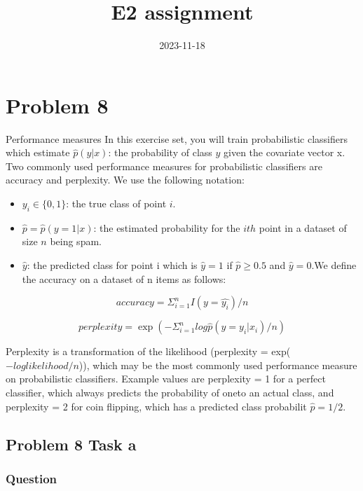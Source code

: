 \documentclass[
]{article}
\title{E2 assignment}
\author{}
\date{\vspace{-2.5em}2023-11-18}
\begin{document}
\maketitle

\hypertarget{problem-8}{%
\section{Problem 8}\label{problem-8}}

Performance measures In this exercise set, you will train probabilistic
classifiers which estimate \(\hat{p}(y | x)\): the probability of class
\(y\) given the covariate vector x. Two commonly used performance
measures for probabilistic classifiers are accuracy and perplexity. We
use the following notation:

\begin{itemize}
\item
  \(y_i \in \{0,1\}\): the true class of point \(i\).
\item
  \(\hat{p} = \hat{p}(y = 1 | x)\): the estimated probability for the
  \(ith\) point in a dataset of size \(n\) being spam.
\item
  \(\hat{y}\): the predicted class for point i which is \(\hat{y} = 1\)
  if \(\hat{p} \geq 0.5\) and \(\hat{y} = 0\).We define the accuracy on
  a dataset of n items as follows:
\end{itemize}

\[
accuracy = \Sigma_{i=1}^{n}I(y = \hat{y_i})/n
\]

\[
perplexity = \exp(-\Sigma_{i=1}^{n}log\hat{p}(y = y_i|x_i)/n)
\]

Perplexity is a transformation of the likelihood (perplexity =
exp(\(-loglikelihood/n\))), which may be the most commonly used
performance measure on probabilistic classifiers. Example values are
perplexity = 1 for a perfect classifier, which always predicts the
probability of oneto an actual class, and perplexity = 2 for coin
flipping, which has a predicted class probabilit \(\hat{p} = 1/2\).

\hypertarget{problem-8-task-a}{%
\subsection{Problem 8 Task a}\label{problem-8-task-a}}

\hypertarget{question}{%
\subsubsection{Question}\label{question}}
\end{document}
